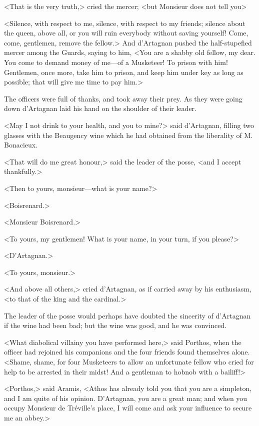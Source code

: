 <That is the very truth,> cried the mercer; <but Monsieur does not tell you\longdash> 

<Silence, with respect to me, silence, with respect to my friends; silence about the queen, above all, or you will ruin everybody without saving yourself! Come, come, gentlemen, remove the fellow.> And d'Artagnan pushed the half-stupefied mercer among the Guards, saying to him, <You are a shabby old fellow, my dear. You come to demand money of me---of a Musketeer! To prison with him! Gentlemen, once more, take him to prison, and keep him under key as long as possible; that will give me time to pay him.> 

The officers were full of thanks, and took away their prey. As they were going down d'Artagnan laid his hand on the shoulder of their leader. 

<May I not drink to your health, and you to mine?> said d'Artagnan, filling two glasses with the Beaugency wine which he had obtained from the liberality of M. Bonacieux. 

<That will do me great honour,> said the leader of the posse, <and I accept thankfully.> 

<Then to yours, monsieur---what is your name?> 

<Boisrenard.> 

<Monsieur Boisrenard.> 

<To yours, my gentlemen! What is your name, in your turn, if you please?> 

<D'Artagnan.> 

<To yours, monsieur.> 

<And above all others,> cried d'Artagnan, as if carried away by his enthusiasm, <to that of the king and the cardinal.> 

The leader of the posse would perhaps have doubted the sincerity of d'Artagnan if the wine had been bad; but the wine was good, and he was convinced. 

<What diabolical villainy you have performed here,> said Porthos, when the officer had rejoined his companions and the four friends found themselves alone. <Shame, shame, for four Musketeers to allow an unfortunate fellow who cried for help to be arrested in their midst! And a gentleman to hobnob with a bailiff!> 

<Porthos,> said Aramis, <Athos has already told you that you are a simpleton, and I am quite of his opinion. D'Artagnan, you are a great man; and when you occupy Monsieur de Tréville's place, I will come and ask your influence to secure me an abbey.> 

